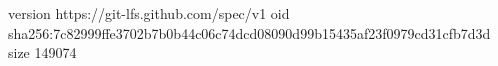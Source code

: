 version https://git-lfs.github.com/spec/v1
oid sha256:7c82999ffe3702b7b0b44c06c74dcd08090d99b15435af23f0979cd31cfb7d3d
size 149074
